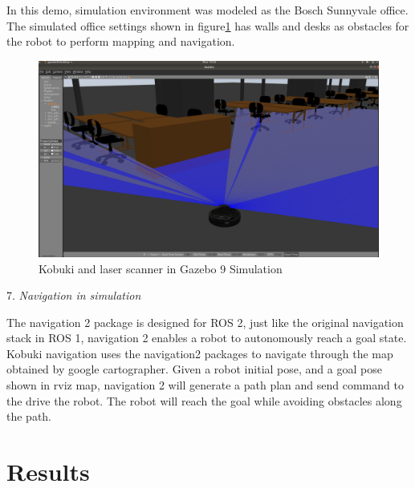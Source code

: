 \documentclass[letterpaper, 10 pt, conference]{ieeeconf}  %
\begin{document}
In this demo, simulation environment was modeled as the Bosch Sunnyvale office. The simulated office settings shown in figure\ref{fig:gazebo} has walls and desks as obstacles for the robot to perform mapping and navigation. \begin{figure}[ht]
  \includegraphics[width=\linewidth]{gazebo_simulation.png}
  \caption{Kobuki and laser scanner in Gazebo 9 Simulation } 
  \label{fig:gazebo}
\end{figure}
\par\vspace{5pt} 

7. \textit{Navigation in simulation} \par\vspace{5pt} 
The navigation 2 package is designed for ROS 2, just like the original navigation stack in ROS 1, navigation 2 enables a robot to autonomously reach a goal state. Kobuki navigation uses the navigation2 packages to navigate through the map obtained by google cartographer. Given a robot initial pose, and a goal pose shown in rviz map, navigation 2 will generate a path plan and send command to the drive the robot. The robot will reach the goal while avoiding obstacles along the path. 
\section{Results}\label{results}
\end{document}

